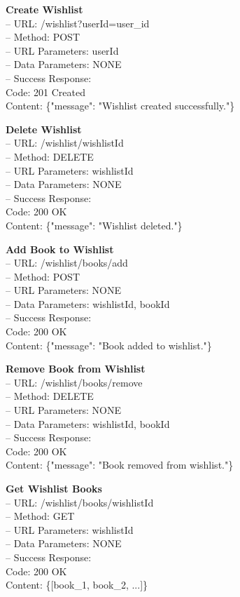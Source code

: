 \textbf{Create Wishlist} \\
– URL: /wishlist?userId={user\_id} \\
– Method: POST \\
– URL Parameters: userId \\
– Data Parameters: NONE \\
– Success Response: \\
Code: 201 Created \\
Content: \{"message": "Wishlist created successfully."\}

\begin{flushleft} 
\textbf{Delete Wishlist} \\
– URL: /wishlist/{wishlistId} \\
– Method: DELETE \\
– URL Parameters: wishlistId \\
– Data Parameters: NONE \\
– Success Response: \\
Code: 200 OK \\
Content: \{"message": "Wishlist deleted."\}
\end{flushleft}

\begin{flushleft} 
\textbf{Add Book to Wishlist} \\
– URL: /wishlist/books/add \\
– Method: POST \\
– URL Parameters: NONE \\
– Data Parameters: wishlistId, bookId \\
– Success Response: \\
Code: 200 OK \\
Content: \{"message": "Book added to wishlist."\}
\end{flushleft}

\begin{flushleft} 
\textbf{Remove Book from Wishlist} \\
– URL: /wishlist/books/remove \\
– Method: DELETE \\
– URL Parameters: NONE \\
– Data Parameters: wishlistId, bookId \\
– Success Response: \\
Code: 200 OK \\
Content: \{"message": "Book removed from wishlist."\}
\end{flushleft}

\begin{flushleft} 
\textbf{Get Wishlist Books} \\
– URL: /wishlist/books/{wishlistId} \\
– Method: GET \\
– URL Parameters: wishlistId \\
– Data Parameters: NONE \\
– Success Response: \\
Code: 200 OK \\
Content: \{[book\_1, book\_2, ...]\}
\end{flushleft}


